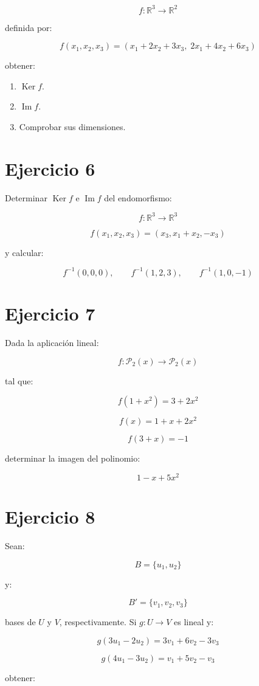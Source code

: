 \documentclass[11pt,a4paper]{article}
\newcommand{\R}{\mathbb{R}}
\newcommand{\Ker}{\operatorname{Ker}}
\newcommand{\Ima}{\operatorname{Im}}
\begin{document}
\[
f:\R^3\longrightarrow\R^2
\]

definida por:

\[
f(x_1,x_2,x_3)
=
(x_1+2x_2+3x_3,\;2x_1+4x_2+6x_3)
\]

obtener:

\begin{enumerate}[label=\alph*)]
	\item $\Ker f$.
	\item $\Ima f$.
	\item Comprobar sus dimensiones.
\end{enumerate}

\section{Ejercicio 6}
Determinar $\Ker f$ e $\Ima f$ del endomorfismo:

\[
f:\R^3\longrightarrow\R^3
\]

\[
f(x_1,x_2,x_3)
=
(x_3,x_1+x_2,-x_3)
\]

y calcular:

\[
f^{-1}(0,0,0),
\qquad
f^{-1}(1,2,3),
\qquad
f^{-1}(1,0,-1)
\]

\section{Ejercicio 7}
Dada la aplicación lineal:

\[
f:\mathcal{P}_2(x)\longrightarrow\mathcal{P}_2(x)
\]

tal que:

\[
f(1+x^2)=3+2x^2
\]

\[
f(x)=1+x+2x^2
\]

\[
f(3+x)=-1
\]

determinar la imagen del polinomio:

\[
1-x+5x^2
\]

\section{Ejercicio 8}
Sean:

\[
B=\{u_1,u_2\}
\]

y:

\[
B'=\{v_1,v_2,v_3\}
\]

bases de $U$ y $V$, respectivamente. Si $g:U\to V$ es lineal y:

\[
g(3u_1-2u_2)=3v_1+6v_2-3v_3
\]

\[
g(4u_1-3u_2)=v_1+5v_2-v_3
\]

obtener:
\end{document}
